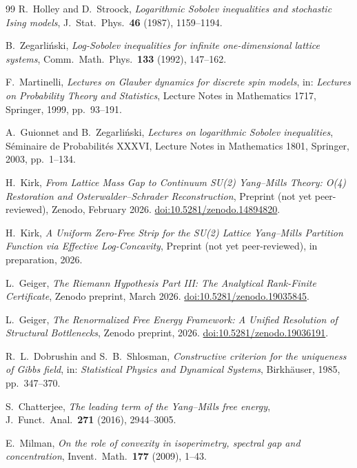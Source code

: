 \documentclass[12pt,a4paper]{article}
\theoremstyle{definition}
\theoremstyle{plain}
\theoremstyle{remark}
\begin{document}
\begin{thebibliography}{99}
R.~Holley and D.~Stroock, \emph{Logarithmic Sobolev inequalities and stochastic Ising models}, J.~Stat.\ Phys.\ \textbf{46} (1987), 1159--1194.

B.~Zegar\-li\'nski, \emph{Log-Sobolev inequalities for infinite one-dimensional lattice systems}, Comm.\ Math.\ Phys.\ \textbf{133} (1992), 147--162.

F.~Martinelli, \emph{Lectures on Glauber dynamics for discrete spin models}, in: \emph{Lectures on Probability Theory and Statistics}, Lecture Notes in Mathematics 1717, Springer, 1999, pp.~93--191.

A.~Guionnet and B.~Zegar\-li\'nski, \emph{Lectures on logarithmic Sobolev inequalities}, S\'eminaire de Probabilit\'es XXXVI, Lecture Notes in Mathematics 1801, Springer, 2003, pp.~1--134.

H.~Kirk, \emph{From Lattice Mass Gap to Continuum SU(2) Yang--Mills Theory: O(4) Restoration and Osterwalder--Schrader Reconstruction}, Preprint (not yet peer-reviewed), Zenodo, February 2026.
\href{https://doi.org/10.5281/zenodo.14894820}{doi:10.5281/zenodo.14894820}.

H.~Kirk, \emph{A Uniform Zero-Free Strip for the SU(2) Lattice Yang--Mills Partition Function via Effective Log-Concavity}, Preprint (not yet peer-reviewed), in preparation, 2026.

L.~Geiger, \emph{The Riemann Hypothesis Part III: The Analytical Rank-Finite Certificate}, Zenodo preprint, March 2026.
\href{https://doi.org/10.5281/zenodo.19035845}{doi:10.5281/zenodo.19035845}.

L.~Geiger, \emph{The Renormalized Free Energy Framework: A Unified Resolution of Structural Bottlenecks}, Zenodo preprint, 2026.
\href{https://doi.org/10.5281/zenodo.19036191}{doi:10.5281/zenodo.19036191}.

R.~L.~Dobrushin and S.~B.~Shlosman, \emph{Constructive criterion for the
uniqueness of Gibbs field}, in: \emph{Statistical Physics and Dynamical
Systems}, Birkh\"auser, 1985, pp.~347--370.

S.~Chatterjee, \emph{The leading term of the Yang--Mills free energy},
J.~Funct.\ Anal.\ \textbf{271} (2016), 2944--3005.

E.~Milman, \emph{On the role of convexity in isoperimetry, spectral gap
and concentration}, Invent.\ Math.\ \textbf{177} (2009), 1--43.


\end{thebibliography}
\end{document}
